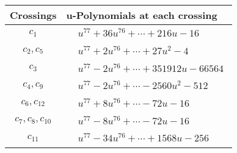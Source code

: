 \documentclass[1p]{elsarticle_modified}
\theoremstyle{definition}
\begin{document}
\begin{tabular}{m{50pt}|m{274pt}}
Crossings & \hspace{64pt}u-Polynomials at each crossing \\
\hline $$\begin{aligned}c_{1}\end{aligned}$$&$\begin{aligned}
&u^{77}+36 u^{76}+\cdots+216 u-16
\end{aligned}$\\
\hline $$\begin{aligned}c_{2},c_{5}\end{aligned}$$&$\begin{aligned}
&u^{77}+2 u^{76}+\cdots+27 u^2-4
\end{aligned}$\\
\hline $$\begin{aligned}c_{3}\end{aligned}$$&$\begin{aligned}
&u^{77}-2 u^{76}+\cdots+351912 u-66564
\end{aligned}$\\
\hline $$\begin{aligned}c_{4},c_{9}\end{aligned}$$&$\begin{aligned}
&u^{77}-2 u^{76}+\cdots-2560 u^2-512
\end{aligned}$\\
\hline $$\begin{aligned}c_{6},c_{12}\end{aligned}$$&$\begin{aligned}
&u^{77}+8 u^{76}+\cdots-72 u-16
\end{aligned}$\\
\hline $$\begin{aligned}c_{7},c_{8},c_{10}\end{aligned}$$&$\begin{aligned}
&u^{77}-8 u^{76}+\cdots-72 u-16
\end{aligned}$\\
\hline $$\begin{aligned}c_{11}\end{aligned}$$&$\begin{aligned}
&u^{77}-34 u^{76}+\cdots+1568 u-256
\end{aligned}$\\
\hline
\end{tabular}\\~\\
\newpage\renewcommand{\arraystretch}{1}
\end{document}
